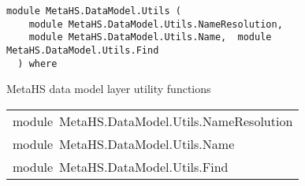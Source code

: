\label{module:MetaHS.DataModel.Utils}
\haddockbeginheader
{\haddockverb\begin{verbatim}
module MetaHS.DataModel.Utils (
    module MetaHS.DataModel.Utils.NameResolution, 
    module MetaHS.DataModel.Utils.Name,  module MetaHS.DataModel.Utils.Find
  ) where\end{verbatim}}
\haddockendheader

MetaHS data model layer utility functions\par

\begin{haddockdesc}
\item[\begin{tabular}{@{}l}
module\ MetaHS.DataModel.Utils.NameResolution\\module\ MetaHS.DataModel.Utils.Name\\module\ MetaHS.DataModel.Utils.Find
\end{tabular}]
\end{haddockdesc}